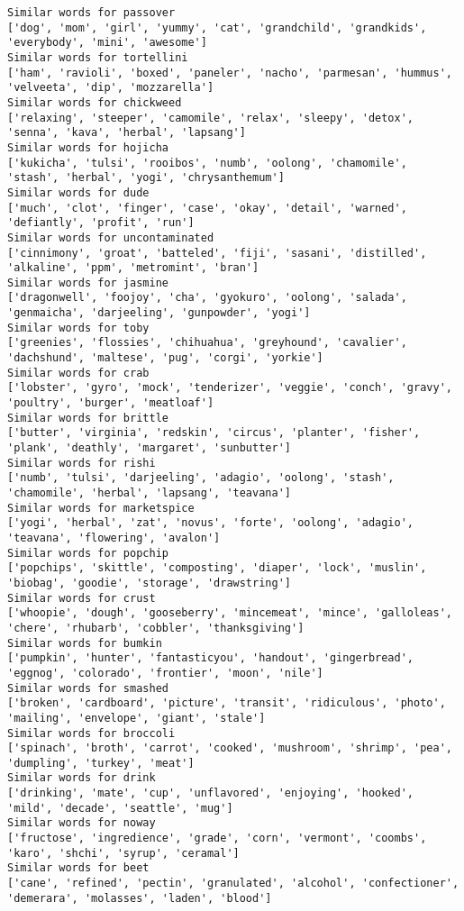 \documentclass[11pt]{article}
\begin{document}
\begin{Verbatim}[commandchars=\\\{\}]
Similar words for passover
['dog', 'mom', 'girl', 'yummy', 'cat', 'grandchild', 'grandkids', 'everybody', 'mini', 'awesome']
Similar words for tortellini
['ham', 'ravioli', 'boxed', 'paneler', 'nacho', 'parmesan', 'hummus', 'velveeta', 'dip', 'mozzarella']
Similar words for chickweed
['relaxing', 'steeper', 'camomile', 'relax', 'sleepy', 'detox', 'senna', 'kava', 'herbal', 'lapsang']
Similar words for hojicha
['kukicha', 'tulsi', 'rooibos', 'numb', 'oolong', 'chamomile', 'stash', 'herbal', 'yogi', 'chrysanthemum']
Similar words for dude
['much', 'clot', 'finger', 'case', 'okay', 'detail', 'warned', 'defiantly', 'profit', 'run']
Similar words for uncontaminated
['cinnimony', 'groat', 'batteled', 'fiji', 'sasani', 'distilled', 'alkaline', 'ppm', 'metromint', 'bran']
Similar words for jasmine
['dragonwell', 'foojoy', 'cha', 'gyokuro', 'oolong', 'salada', 'genmaicha', 'darjeeling', 'gunpowder', 'yogi']
Similar words for toby
['greenies', 'flossies', 'chihuahua', 'greyhound', 'cavalier', 'dachshund', 'maltese', 'pug', 'corgi', 'yorkie']
Similar words for crab
['lobster', 'gyro', 'mock', 'tenderizer', 'veggie', 'conch', 'gravy', 'poultry', 'burger', 'meatloaf']
Similar words for brittle
['butter', 'virginia', 'redskin', 'circus', 'planter', 'fisher', 'plank', 'deathly', 'margaret', 'sunbutter']
Similar words for rishi
['numb', 'tulsi', 'darjeeling', 'adagio', 'oolong', 'stash', 'chamomile', 'herbal', 'lapsang', 'teavana']
Similar words for marketspice
['yogi', 'herbal', 'zat', 'novus', 'forte', 'oolong', 'adagio', 'teavana', 'flowering', 'avalon']
Similar words for popchip
['popchips', 'skittle', 'composting', 'diaper', 'lock', 'muslin', 'biobag', 'goodie', 'storage', 'drawstring']
Similar words for crust
['whoopie', 'dough', 'gooseberry', 'mincemeat', 'mince', 'galloleas', 'chere', 'rhubarb', 'cobbler', 'thanksgiving']
Similar words for bumkin
['pumpkin', 'hunter', 'fantasticyou', 'handout', 'gingerbread', 'eggnog', 'colorado', 'frontier', 'moon', 'nile']
Similar words for smashed
['broken', 'cardboard', 'picture', 'transit', 'ridiculous', 'photo', 'mailing', 'envelope', 'giant', 'stale']
Similar words for broccoli
['spinach', 'broth', 'carrot', 'cooked', 'mushroom', 'shrimp', 'pea', 'dumpling', 'turkey', 'meat']
Similar words for drink
['drinking', 'mate', 'cup', 'unflavored', 'enjoying', 'hooked', 'mild', 'decade', 'seattle', 'mug']
Similar words for noway
['fructose', 'ingredience', 'grade', 'corn', 'vermont', 'coombs', 'karo', 'shchi', 'syrup', 'ceramal']
Similar words for beet
['cane', 'refined', 'pectin', 'granulated', 'alcohol', 'confectioner', 'demerara', 'molasses', 'laden', 'blood']

\end{Verbatim}
\end{document}
